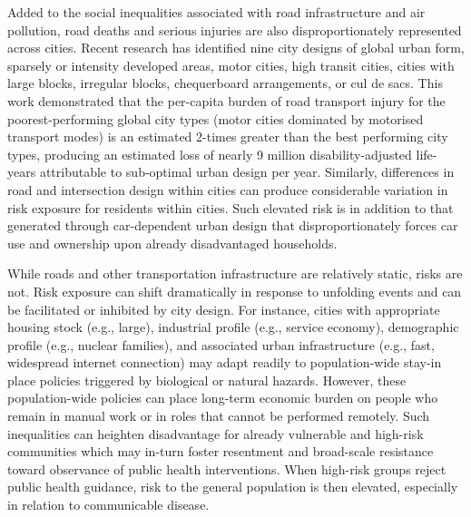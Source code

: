 \documentclass[preprint,12pt]{elsarticle}
\begin{document}
Added to the social inequalities associated with road infrastructure and air pollution, road deaths and serious injuries are also disproportionately represented across cities. Recent research has identified nine city designs\cite{Thompson2020} of global urban form, sparsely or intensity developed areas, motor cities, high transit cities, cities with large blocks, irregular blocks, chequerboard arrangements, or cul de sacs. This work demonstrated that the per-capita burden of road transport injury for the poorest-performing global city types (motor cities dominated by motorised transport modes) is an estimated 2-times greater than the best performing city types, producing an estimated loss of nearly 9 million disability-adjusted life-years attributable to sub-optimal urban design per year\cite{Thompson2020}. Similarly, differences in road and intersection design within cities can produce considerable variation in risk exposure for residents within cities\cite{Wijnands_IntersectionDesign2021,MORRISON2019123}. Such elevated risk is in addition to that generated through car-dependent urban design that disproportionately forces car use and ownership upon already disadvantaged households\cite{currie2018alarming, CURL201861}. 

While roads and other transportation infrastructure are relatively static, risks are not. Risk exposure can shift dramatically in response to unfolding events and can be facilitated or inhibited by city design. For instance, cities with appropriate housing stock (e.g., large), industrial profile (e.g., service economy), demographic profile (e.g., nuclear families), and associated urban infrastructure (e.g., fast, widespread internet connection) may adapt readily to population-wide stay-in place policies triggered by biological or natural hazards\cite{hale2021global}. However, these population-wide policies can place long-term economic burden on people who remain in manual work or in roles that cannot be performed remotely\cite{CraigWFH,Vyas2021}. Such inequalities can heighten disadvantage for already vulnerable and high-risk communities\cite{martin2020fighting} which may in-turn foster resentment and broad-scale resistance toward observance of public health interventions\cite{de2016sustainability}. When high-risk groups reject public health guidance, risk to the general population is then elevated, especially in relation to communicable disease\cite{koopman2005control}.
\end{document}
